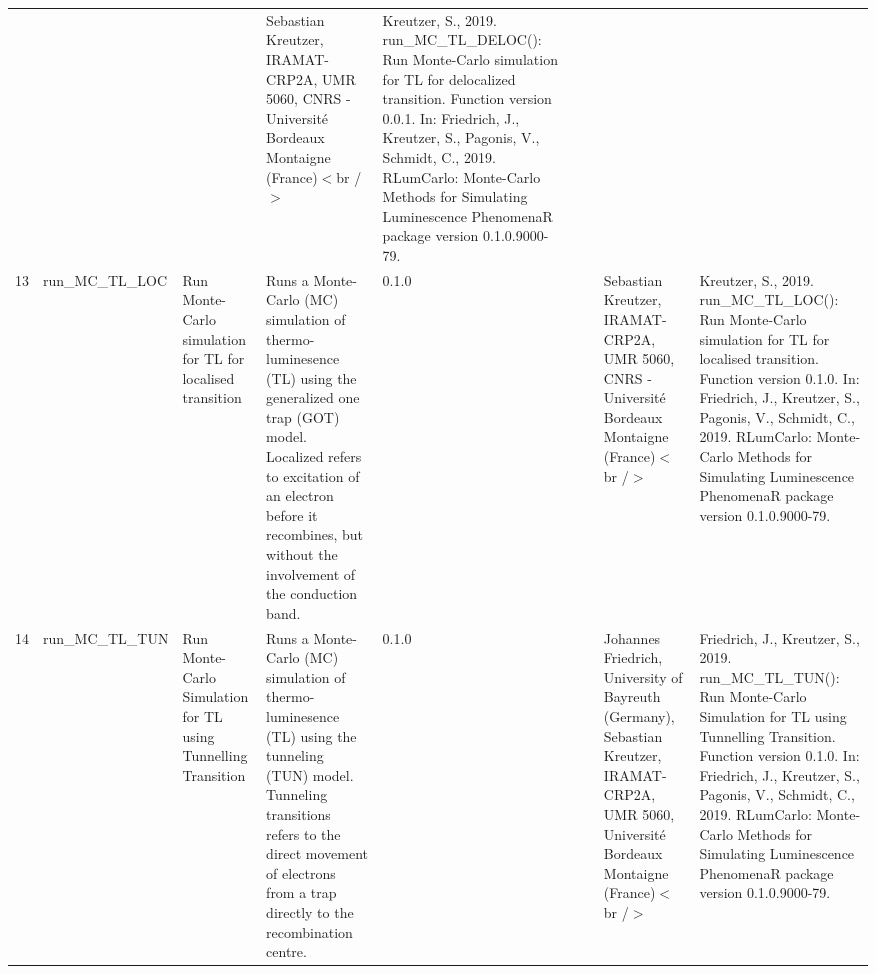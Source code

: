 \begin{table}[ht]
\begin{tabular}{rllllllll}
 &  &  & Sebastian Kreutzer, IRAMAT-CRP2A, UMR 5060, CNRS - Université Bordeaux Montaigne (France)$<$br /$>$ & Kreutzer, S., 2019. run\_MC\_TL\_DELOC(): Run Monte-Carlo simulation for TL for delocalized transition. Function version 0.0.1. In: Friedrich, J., Kreutzer, S., Pagonis, V., Schmidt, C., 2019. RLumCarlo: Monte-Carlo Methods for Simulating Luminescence PhenomenaR package version 0.1.0.9000-79. 
 \\ 
  13 & run\_MC\_TL\_LOC & Run Monte-Carlo simulation for TL for localised transition & Runs a Monte-Carlo (MC) simulation of thermo-luminesence (TL) using the generalized one trap (GOT) model. Localized refers to excitation of an electron before it recombines, but without the involvement of the conduction band. & 0.1.0
 &  &  & Sebastian Kreutzer, IRAMAT-CRP2A, UMR 5060, CNRS - Université Bordeaux Montaigne (France)$<$br /$>$ & Kreutzer, S., 2019. run\_MC\_TL\_LOC(): Run Monte-Carlo simulation for TL for localised transition. Function version 0.1.0. In: Friedrich, J., Kreutzer, S., Pagonis, V., Schmidt, C., 2019. RLumCarlo: Monte-Carlo Methods for Simulating Luminescence PhenomenaR package version 0.1.0.9000-79. 
 \\ 
  14 & run\_MC\_TL\_TUN & Run Monte-Carlo Simulation for TL using Tunnelling Transition & Runs a Monte-Carlo (MC) simulation of thermo-luminesence (TL) using the tunneling (TUN) model. Tunneling transitions refers to the direct movement of electrons from a trap directly to the recombination centre. & 0.1.0
 &  &  & Johannes Friedrich, University of Bayreuth (Germany), Sebastian Kreutzer, IRAMAT-CRP2A, UMR 5060, Université Bordeaux Montaigne (France)$<$br /$>$ & Friedrich, J., Kreutzer, S., 2019. run\_MC\_TL\_TUN(): Run Monte-Carlo Simulation for TL using Tunnelling Transition. Function version 0.1.0. In: Friedrich, J., Kreutzer, S., Pagonis, V., Schmidt, C., 2019. RLumCarlo: Monte-Carlo Methods for Simulating Luminescence PhenomenaR package version 0.1.0.9000-79. 
 \\ 
   \hline
\end{tabular}
\end{table}

